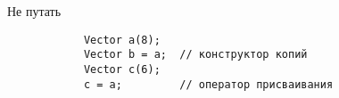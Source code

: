 \documentclass[aspectratio=169,14pt]{beamer}
\begin{document}
%
%
%
%
%
%
%
%
%
%
%
%
%
%
%
%
%
%
%
%
%
%


    \begin{frame}[fragile]{Не путать}
        \begin{verbatim}
            Vector a(8);
            Vector b = a;  // конструктор копий
            Vector c(6);
            c = a;         // оператор присваивания
        \end{verbatim}
    \end{frame}
\end{document}
